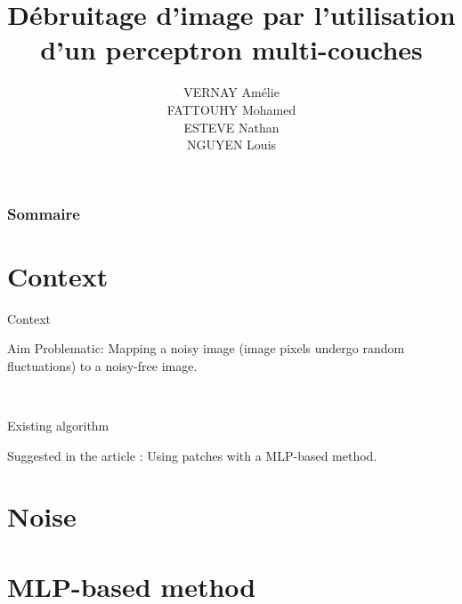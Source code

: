 \documentclass[8pt]{beamer}
\title{Débruitage d'image par l'utilisation d'un perceptron multi-couches}
\author{VERNAY Amélie \\ FATTOUHY Mohamed \\ ESTEVE Nathan \\ NGUYEN Louis}
\begin{document}
\begin{frame}
\titlepage
\end{frame}


\begin{frame}
\frametitle{Sommaire}
\tableofcontents
\end{frame}


\section{Context}

\begin{frame}{Context}
\begin{block}{Aim}
Problematic: Mapping a noisy image (image pixels undergo random fluctuations) to a noisy-free image.
\end{block}\

\begin{block}{Existing algorithm}
\end{block}

\begin{block}{}
Suggested in the article : Using patches with a MLP-based method.
\end{block}


\end{frame}

\section{Noise}

\begin{frame}
\end{frame}

\section{MLP-based method}
\end{document}
